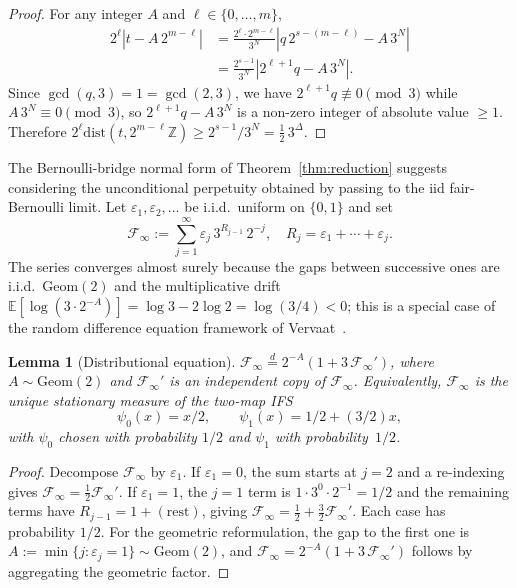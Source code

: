 \documentclass[11pt,a4paper]{amsart}
\theoremstyle{plain}
\newtheorem{lemma}[theorem]{Lemma}
\theoremstyle{definition}
\newcommand{\Z}{\mathbb{Z}}
\newcommand{\E}{\mathbb{E}}
\newcommand{\Geom}{\mathrm{Geom}}
\newcommand{\dist}{\mathrm{dist}}
\begin{document}
\begin{proof}
For any integer $A$ and $\ell\in\{0,\dots,m\}$,
\begin{align*}
2^\ell|t-A\,2^{m-\ell}|
&=\frac{2^\ell\cdot 2^{m-\ell}}{3^N}|q\,2^{s-(m-\ell)}-A\,3^N|\\
&=\frac{2^{s-1}}{3^N}|2^{\ell+1}q-A\,3^N|.
\end{align*}
Since $\gcd(q,3)=1=\gcd(2,3)$, we have $2^{\ell+1}q\not\equiv0\pmod3$
while $A\,3^N\equiv 0\pmod 3$, so $2^{\ell+1}q-A\,3^N$ is a non-zero
integer of absolute value $\ge1$.
Therefore $2^\ell\dist(t,2^{m-\ell}\Z)\ge 2^{s-1}/3^N=\frac12\,3^\Delta$.
\end{proof}

The Bernoulli-bridge normal form of Theorem~\ref{thm:reduction} suggests
considering the unconditional perpetuity obtained by passing to the iid
fair-Bernoulli limit.
Let $\varepsilon_1,\varepsilon_2,\dots$ be i.i.d.\ uniform on $\{0,1\}$ and
set
\begin{equation}\label{eq:Finfty}
\mathcal F_\infty:=\sum_{j=1}^\infty\varepsilon_j\,3^{R_{j-1}}\,2^{-j},
\quad R_j=\varepsilon_1+\cdots+\varepsilon_j.
\end{equation}
The series converges almost surely because the gaps between successive
ones are i.i.d.\ $\Geom(2)$ and the multiplicative drift
$\E[\log(3\cdot 2^{-A})]=\log 3-2\log 2=\log(3/4)<0$;
this is a special case of the random difference equation framework
of Vervaat~\cite{Vervaat}.

\begin{lemma}[Distributional equation]\label{lem:dist-eq}
$\mathcal F_\infty\overset d=2^{-A}(1+3\,\mathcal F_\infty')$, where
$A\sim\Geom(2)$ and $\mathcal F_\infty'$ is an independent copy of
$\mathcal F_\infty$.
Equivalently, $\mathcal F_\infty$ is the unique stationary measure of the
two-map IFS
\begin{equation}\label{eq:IFS}
\psi_0(x)=x/2,\qquad\psi_1(x)=1/2+(3/2)x,
\end{equation}
with $\psi_0$ chosen with probability $1/2$ and $\psi_1$ with
probability~$1/2$.
\end{lemma}

\begin{proof}
Decompose $\mathcal F_\infty$ by $\varepsilon_1$.
If $\varepsilon_1=0$, the sum starts at $j=2$ and a re-indexing gives
$\mathcal F_\infty=\tfrac12\mathcal F_\infty'$.
If $\varepsilon_1=1$, the $j=1$ term is $1\cdot 3^0\cdot 2^{-1}=1/2$ and
the remaining terms have $R_{j-1}=1+(\text{rest})$, giving
$\mathcal F_\infty=\tfrac12+\tfrac32\mathcal F_\infty'$.
Each case has probability $1/2$.
For the geometric reformulation, the gap to the first one is
$A:=\min\{j:\varepsilon_j=1\}\sim\Geom(2)$, and
$\mathcal F_\infty=2^{-A}(1+3\,\mathcal F_\infty')$ follows by aggregating
the geometric factor.
\end{proof}
\end{document}
